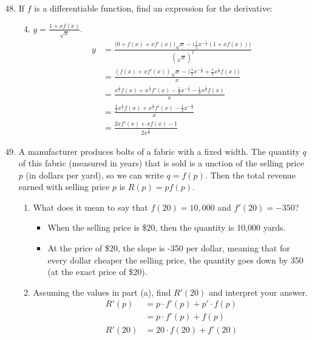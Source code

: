 \documentclass{article}
\begin{document}
\begin{enumerate}
\setcounter{enumi}{47}
	\item If $f$ is a differentiable function, find an expression for the derivative:
		\begin{enumerate}
			\setcounter{enumii}{3}
			\item $y=\frac{1+xf(x)}{\sqrt{x}}$.
			$$\begin{align}
				y &= \frac{\big(0+f(x)+xf'(x)\big)\sqrt{x}-\big(\frac{1}{2}x^{-\frac{1}{2}}(1+xf(x))\big)}{(\sqrt{x})^2} \\
				 &= \frac{(f(x)+xf'(x))\sqrt{x}-\big(\frac{1}{2}x^{-\frac{1}{2}}+\frac{1}{2}x^{\frac{1}{2}}f(x)\big)}{x} \\
				 &= \frac{x^{\frac{1}{2}}f(x)+x^{\frac{1}{2}}f'(x)-\frac{1}{2}x^{-\frac{1}{2}}-\frac{1}{2}x^{\frac{1}{2}}f(x)}{x} \\
				 &= \frac{\frac{1}{2}x^{\frac{1}{2}}f(x)+x^{\frac{1}{2}}f'(x)-\frac{1}{2}x^{-\frac{1}{2}}}{x}\\
				 &= \frac{2xf'(x)+xf(x)-1}{2x^{\frac{2}{3}}}
			\end{align}$$
		\end{enumerate}
\setcounter{enumi}{49}
	\item A manufacturer produces bolts of a fabric with a fixed width. The quantity $q$ of this fabric (measured in years) that is sold is a unction of the selling price $p$ (in dollars per yard), so we can write $q=f(p)$. Then the total revenue earned with selling price $p$ is $R(p)=pf(p)$.
		\begin{enumerate}
			\item What does it mean to say that $f(20)=10,000$ and $f'(20)=-350$?
				\begin{itemize}
					\item When the selling price is \$20, then the quantity is 10,000 yards.
					\item At the price of \$20, the slope is -350 per dollar, meaning that for every dollar cheaper the selling price, the quantity goes down by 350 (at the exact price of \$20).
				\end{itemize}
			\item Assuming the values in part (a), find $R'(20)$ and interpret your answer.
				$$\begin{align}
					R'(p) &= p\cdot f'(p) + p' \cdot f(p)\\
						&= p\cdot f'(p) + f(p)\\
						R'(20) &= 20 \cdot f(20) + f'(20)\\

\end{align}$$
\end{enumerate}
\end{enumerate}
\end{document}
